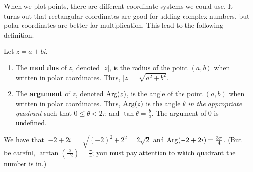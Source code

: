 When we plot points, there are different coordinate systems we could use. It turns out that  rectangular coordinates are good for adding complex numbers, but polar coordinates are better for multiplication. This lead to the following definition.

\begin{definition}
Let $z=a+bi$. 
\begin{enumerate}
\item The \textbf{modulus} of $z$, denoted $|z|$, is the radius of the point $(a,b)$ when written in polar coordinates. Thus, $|z| = \sqrt{a^2 + b^2}$. 
\item The \textbf{argument} of $z$, denoted $\operatorname{Arg}(z)$, is the angle of the point $(a,b)$ when written in polar coordinates. Thus, $\operatorname{Arg}(z)$ is the angle $\theta$ \emph{in the appropriate quadrant} such that $0\le \theta<2\pi$ and $\tan \theta = \frac{b}{a}$. The argument of  $0$ is undefined.
\end{enumerate}
\end{definition}

\begin{example}
We have that $|-2 + 2i| = \sqrt{(-2)^2+2^2} = 2\sqrt{2}$ and $\operatorname{Arg}(-2 + 2i) = \frac{3\pi}{4}$. (But be careful, $\arctan\left(\frac{2}{-2}\right) = \frac{\pi}{4}$; you must pay attention to which quadrant the number is in.)
\begin{center}
\end{center}
\end{example}

